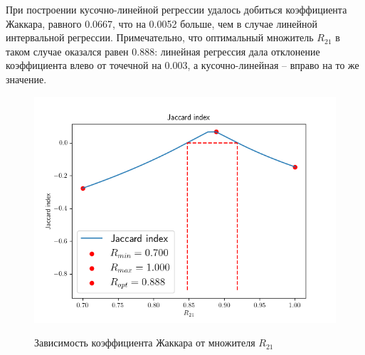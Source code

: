 При построении кусочно-линейной регрессии удалось добиться коэффициента Жаккара, равного 0.0667, что на 0.0052 больше, чем в случае линейной интервальной регрессии. Примечательно, что оптимальный множитель $R_{21}$ в таком случае оказался равен 0.888: линейная регрессия дала отклонение коэффициента влево от точечной на 0.003, а кусочно-линейная -- вправо на то же значение.

\begin{figure}[H]
	\begin{center}
		\includegraphics[scale=0.75]{jaccard_partial}
		\label{pic:jaccard2}
		\caption{Зависимость коэффициента Жаккара от множителя $R_{21}$}
	\end{center}
\end{figure}
